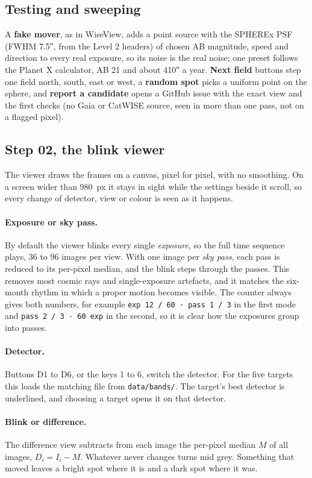 \documentclass[11pt,a4paper]{article}
\begin{document}
\subsection{Testing and sweeping}
A \textbf{fake mover}, as in WiseView, adds a point source with the SPHEREx PSF
(FWHM \ang{;;7.5}, from the Level 2 headers) of chosen AB magnitude, speed and direction to every
real exposure, so its noise is the real noise; one preset follows the Planet X calculator,
AB 21 and about \ang{;;410} a year. \textbf{Next field} buttons step one field north,
south, east or west, a \textbf{random spot} picks a uniform point on the sphere, and
\textbf{report a candidate} opens a GitHub issue with the exact view and the first checks
(no Gaia or CatWISE source, seen in more than one pass, not on a flagged pixel).

\subsection{Step 02, the blink viewer}
The viewer draws the frames on a canvas, pixel for pixel, with no smoothing. On a screen wider
than \SI{980}{px} it stays in sight while the settings beside it scroll, so every change of
detector, view or colour is seen as it happens.

\paragraph{Exposure or sky pass.} By default the viewer blinks every single \emph{exposure}, so
the full time sequence plays, 36 to 96 images per view. With one image per \emph{sky pass}, each
pass is reduced to its per-pixel median, and the blink steps through the passes. This removes most
cosmic rays and single-exposure artefacts, and it matches the six-month rhythm in which a proper
motion becomes visible. The counter always gives both numbers, for example
\texttt{exp 12 / 60 · pass 1 / 3} in the first mode and \texttt{pass 2 / 3 · 60 exp} in the
second, so it is clear how the exposures group into passes.

\paragraph{Detector.} Buttons D1 to D6, or the keys 1 to 6, switch the detector. For the five
targets this loads the matching file from \texttt{data/bands/}. The target's best detector is
underlined, and choosing a target opens it on that detector.

\paragraph{Blink or difference.} The difference view subtracts from each image the per-pixel
median $M$ of all images, $D_i = I_i - M$. Whatever never changes turns mid grey. Something that
moved leaves a bright spot where it is and a dark spot where it was.
\end{document}
